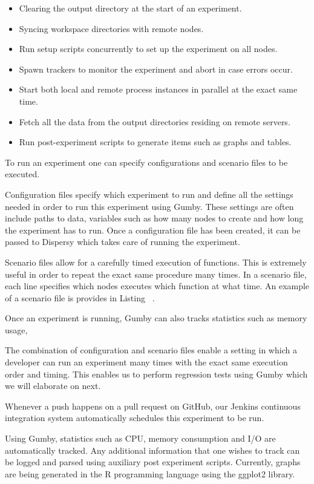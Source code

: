 \begin{itemize}
	\item Clearing the output directory at the start of an experiment.
	\item Syncing workspace directories with remote nodes.
	\item Run setup scripts concurrently to set up the experiment on all nodes.
	\item Spawn trackers to monitor the experiment and abort in case errors occur.
	\item Start both local and remote process instances in parallel at the exact same time.
	\item Fetch all the data from the output directories residing on remote servers.
	\item Run post-experiment scripts to generate items such as graphs and tables.
\end{itemize}

To run an experiment one can specify configurations and scenario files to be executed.

Configuration files specify which experiment to run and define all the settings needed in order to run this experiment using Gumby.
These settings are often include paths to data, variables such as how many nodes to create and how long the experiment has to run.
Once a configuration file has been created, it can be passed to Dispersy which takes care of running the experiment.

Scenario files allow for a carefully timed execution of functions.
This is extremely useful in order to repeat the exact same procedure many times.
In a scenario file, each line specifies which nodes executes which function at what time.
An example of a scenario file is provides in Listing~ .

Once an experiment is running, Gumby can also tracks statistics such as memory usage, 

The combination of configuration and scenario files enable a setting in which a developer can run an experiment many times with the exact same execution order and timing.
This enables us to perform regression tests using Gumby which we will elaborate on next.


Whenever a push happens on a pull request on GitHub, our Jenkins continuous integration system automatically schedules this experiment to be run.

Using Gumby, statistics such as CPU, memory consumption and I/O are automatically tracked.
Any additional information that one wishes to track can be logged and parsed using auxiliary post experiment scripts.
Currently, graphs are being generated in the R programming language using the ggplot2 library.

